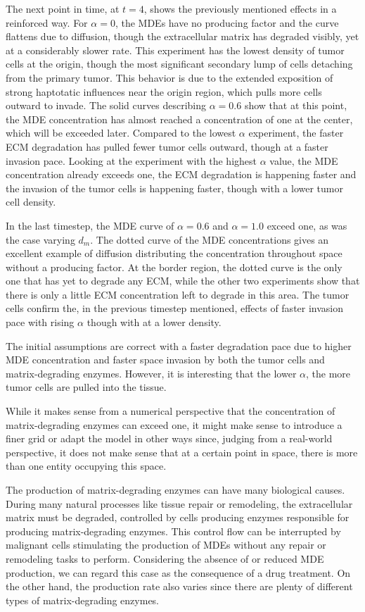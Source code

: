 The next point in time, at $t=4$, shows the previously mentioned effects in a reinforced way. For $\alpha=0$, the MDEs have no producing factor and the curve flattens due to diffusion, though the extracellular matrix has degraded visibly, yet at a considerably slower rate. This experiment has the lowest density of tumor cells at the origin, though the most significant secondary lump of cells detaching from the primary tumor. This behavior is due to the extended exposition of strong haptotatic influences near the origin region, which pulls more cells outward to invade. The solid curves describing $\alpha = 0.6$ show that at this point, the MDE concentration has almost reached a concentration of one at the center, which will be exceeded later. Compared to the lowest $\alpha$ experiment, the faster ECM degradation has pulled fewer tumor cells outward, though at a faster invasion pace. Looking at the experiment with the highest $\alpha$ value, the MDE concentration already exceeds one, the ECM degradation is happening faster and the invasion of the tumor cells is happening faster, though with a lower tumor cell density.

In the last timestep, the MDE curve of $\alpha=0.6$ and $\alpha=1.0$ exceed one, as was the case varying $d_m$. The dotted curve of the MDE concentrations gives an excellent example of diffusion distributing the concentration throughout space without a producing factor. At the border region, the dotted curve is the only one that has yet to degrade any ECM, while the other two experiments show that there is only a little ECM concentration left to degrade in this area. 
The tumor cells confirm the, in the previous timestep mentioned, effects of faster invasion pace with rising $\alpha$ though with at a lower density.

The initial assumptions are correct with a faster degradation pace due to higher MDE concentration and faster space invasion by both the tumor cells and matrix-degrading enzymes. However, it is interesting that the lower $\alpha$, the more tumor cells are pulled into the tissue.

While it makes sense from a numerical perspective that the concentration of matrix-degrading enzymes can exceed one, it might make sense to introduce a finer grid or adapt the model in other ways since, judging from a real-world perspective, it does not make sense that at a certain point in space, there is more than one entity occupying this space.

The production of matrix-degrading enzymes can have many biological causes. During many natural processes like tissue repair or remodeling, the extracellular matrix must be degraded, controlled by cells producing enzymes responsible for producing matrix-degrading enzymes. This control flow can be interrupted by malignant cells stimulating the production of MDEs without any repair or remodeling tasks to perform. Considering the absence of or reduced MDE production, we can regard this case as the consequence of a drug treatment. On the other hand, the production rate also varies since there are plenty of different types of matrix-degrading enzymes.

